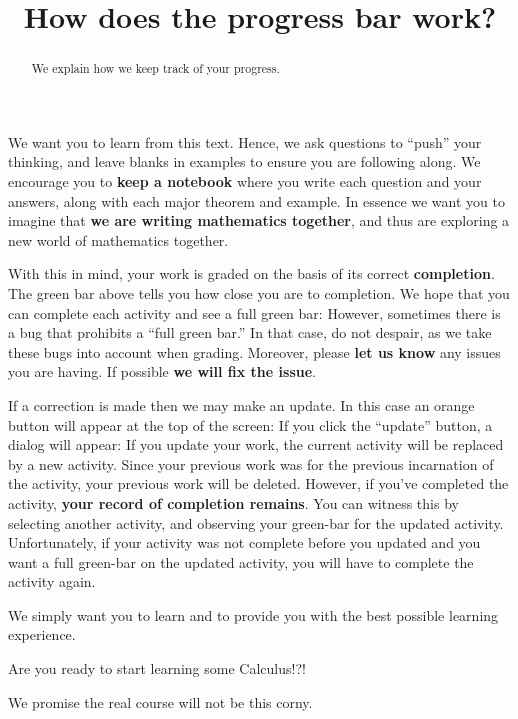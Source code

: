 \documentclass{ximera}
\title{How does the progress bar work?}
\begin{document}
\begin{abstract}
  We explain how we keep track of your progress.
\end{abstract}
\maketitle

We want you to learn from this text. Hence, we ask questions to
``push'' your thinking, and leave blanks in examples to ensure you are
following along. We encourage you to \textbf{keep a notebook} where
you write each question and your answers, along with each major
theorem and example. In essence we want you to imagine that \textbf{we
  are writing mathematics together}, and thus are exploring a new
world of mathematics together.

With this in mind, your work is graded on the basis of its correct
\textbf{completion}. The green bar above
tells you how close you are to completion. We hope that you can
complete each activity and see a full green bar:
However, sometimes there is a bug that prohibits a ``full green bar.''
In that case, do not despair, as we take these bugs into account when
grading. Moreover, please \textbf{let us know} any issues you are
having. If possible \textbf{we will fix the issue}.

If a correction is made then we may make an update. In this case an orange button will appear at the top of the screen:
If you click the ``update'' button, a dialog will appear:
If you update your work, the current activity will be replaced by a
new activity. Since your previous work was for the previous
incarnation of the activity, your previous work will be
deleted. However, if you've completed the activity, \textbf{your
  record of completion remains}. You can witness this by selecting
another activity, and observing your green-bar for the updated
activity.  Unfortunately, if your activity was not complete before you
updated and you want a full green-bar on the updated activity, you
will have to complete the activity again.



We simply want you to learn and to provide you with the best possible
learning experience.

\begin{problem}
  Are you ready to start learning some Calculus!?!
  \begin{multipleChoice}
  \end{multipleChoice}
  \begin{hint}
    We promise the real course will not be this corny.
  \end{hint}
\end{problem}
\end{document}
